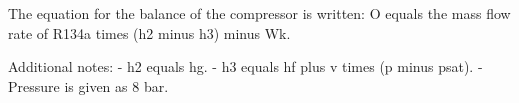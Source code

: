 The equation for the balance of the compressor is written:  
O equals the mass flow rate of R134a times (h2 minus h3) minus Wk.  

Additional notes:  
- h2 equals hg.  
- h3 equals hf plus v times (p minus psat).  
- Pressure is given as 8 bar.